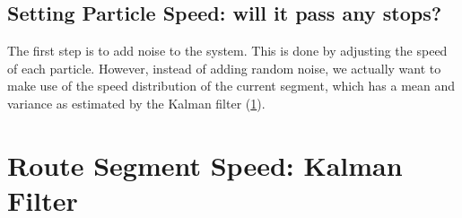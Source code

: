 \documentclass[14paper,twoside]{article}
\begin{document}
\subsection{Setting Particle Speed: will it pass any stops?}

The first step is to add noise to the system.
This is done by adjusting the speed of each particle.
However, instead of adding random noise, 
we actually want to make use of the speed distribution of the current segment,
which has a mean and variance as estimated by the Kalman filter (\cref{sec:speed}).





\section{Route Segment Speed: Kalman Filter}
\label{sec:speed}
\end{document}
